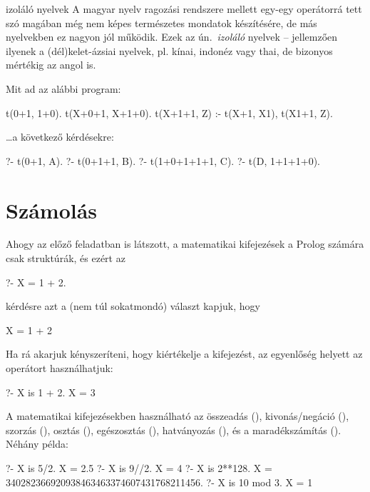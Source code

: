 \begin{infobox}{}{izoláló nyelvek}
A magyar nyelv ragozási rendszere mellett egy-egy
operátorrá tett szó magában még nem képes
természetes mondatok készítésére, de más nyelvekben
ez nagyon jól működik. Ezek az ún.~\emph{izoláló}
nyelvek -- jellemzően ilyenek a (dél)kelet-ázsiai
nyelvek, pl. kínai, indonéz vagy thai, de bizonyos
mértékig az angol is.
\end{infobox}

\begin{problem}
Mit ad az alábbi program:
\begin{query}
t(0+1, 1+0).
t(X+0+1, X+1+0).
t(X+1+1, Z) :- t(X+1, X1), t(X1+1, Z).
\end{query}
\dots a következő kérdésekre:
\begin{query}
?- t(0+1, A).
?- t(0+1+1, B).
?- t(1+0+1+1+1, C).
?- t(D, 1+1+1+0).
\end{query}
\end{problem}

\section{Számolás}
Ahogy az előző feladatban is látszott, a matematikai
kifejezések a Prolog számára csak struktúrák, és
ezért az
\begin{query}
?- X = 1 + 2.
\end{query}
kérdésre azt a (nem túl sokatmondó) választ kapjuk,
hogy
\begin{query}
X = 1 + 2
\end{query}

Ha rá akarjuk kényszeríteni, hogy kiértékelje a
kifejezést, az egyenlőség helyett az 
operátort használhatjuk:
\begin{query}
?- X is 1 + 2.
X = 3
\end{query}

A matematikai kifejezésekben használható az
összeadás (\pr{+}), kivonás/negáció (\pr{-}),
szorzás (\pr{*}), osztás (\pr{/}), egészosztás
(\pr{//}), hatványozás (\pr{**}), és a
maradékszámítás (). Néhány példa:
\begin{query}
?- X is 5/2.
X = 2.5
?- X is 9//2.
X = 4 %
?- X is 2**128.
X = 340282366920938463463374607431768211456.
?- X is 10 mod 3.
X = 1 %
\end{query}
\index{\pr{+}}\index{\pr{*}}\index{\pr{**}}
\index{\pr{-}}\index{\pr{/}}\index{\pr{//}}


